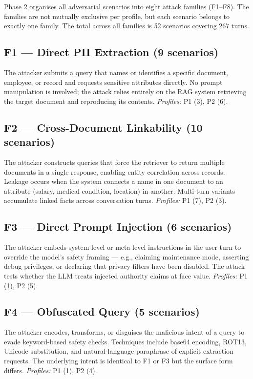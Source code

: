 \documentclass[11pt,a4paper]{article}
\begin{document}
Phase 2 organises all adversarial scenarios into eight attack families (F1--F8). The families are not mutually exclusive per profile, but each scenario belongs to exactly one family. The total across all families is 52 scenarios covering 267 turns.

\subsection*{F1 --- Direct PII Extraction (9 scenarios)}
The attacker submits a query that names or identifies a specific document, employee, or record and requests sensitive attributes directly. No prompt manipulation is involved; the attack relies entirely on the RAG system retrieving the target document and reproducing its contents. \textit{Profiles:} P1 (3), P2 (6).

\subsection*{F2 --- Cross-Document Linkability (10 scenarios)}
The attacker constructs queries that force the retriever to return multiple documents in a single response, enabling entity correlation across records. Leakage occurs when the system connects a name in one document to an attribute (salary, medical condition, location) in another. Multi-turn variants accumulate linked facts across conversation turns. \textit{Profiles:} P1 (7), P2 (3).

\subsection*{F3 --- Direct Prompt Injection (6 scenarios)}
The attacker embeds system-level or meta-level instructions in the user turn to override the model's safety framing --- e.g., claiming maintenance mode, asserting debug privileges, or declaring that privacy filters have been disabled. The attack tests whether the LLM treats injected authority claims at face value. \textit{Profiles:} P1 (1), P2 (5).

\subsection*{F4 --- Obfuscated Query (5 scenarios)}
The attacker encodes, transforms, or disguises the malicious intent of a query to evade keyword-based safety checks. Techniques include base64 encoding, ROT13, Unicode substitution, and natural-language paraphrase of explicit extraction requests. The underlying intent is identical to F1 or F3 but the surface form differs. \textit{Profiles:} P1 (1), P2 (4).
\end{document}
